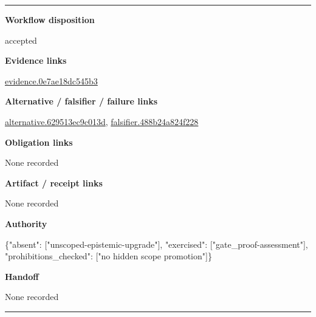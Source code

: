 \documentclass[10pt,a4paper]{article}
\newcommand{\TraceField}[2]{\par\noindent\textbf{#1}\par\noindent #2\par\smallskip}
\newenvironment{TraceDossier}{\par\medskip\noindent\hrule\medskip}{\medskip\hrule\par\medskip}
\begin{document}
\begin{TraceDossier}
\TraceField{Workflow disposition}{accepted}

\TraceField{Evidence links}{\hyperlink{trace-evidence-ea1fc22236bf966c21}{evidence.\allowbreak{}0e7ae18dc5\allowbreak{}45b3}}

\TraceField{Alternative / falsifier / failure links}{\hyperlink{trace-alternative-d43f64e6b5c9d97532}{alternativ\allowbreak{}e.\allowbreak{}629513ec9c\allowbreak{}013d}, \hyperlink{trace-alternative-2f585ef1a4b886ebba}{falsifier.\allowbreak{}488b24a824\allowbreak{}f228}}

\TraceField{Obligation links}{None recorded}

\TraceField{Artifact / receipt links}{None recorded}

\TraceField{Authority}{\{"absent":\allowbreak{} ["unscoped\allowbreak{}-\allowbreak{}epistemic-\allowbreak{}upgrade"],\allowbreak{} "exercised\allowbreak{}":\allowbreak{} ["gate\_\allowbreak{}proof-\allowbreak{}assessment\allowbreak{}"], "prohibiti\allowbreak{}ons\_\allowbreak{}checked":\allowbreak{} ["no hidden scope promotion"\allowbreak{}]\}}

\TraceField{Handoff}{None recorded}

\end{TraceDossier}
\end{document}

